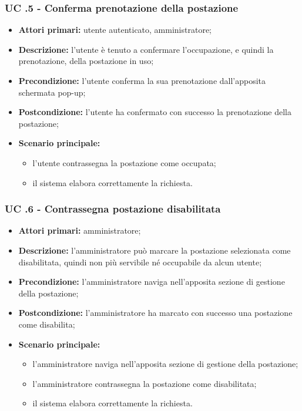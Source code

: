 \subsubsection{UC .5 - Conferma prenotazione della postazione}

\begin{itemize}
\item \textbf{Attori primari:} utente autenticato, amministratore;
\item \textbf{Descrizione:} l’utente è tenuto a confermare l’occupazione, e quindi la prenotazione, della postazione in uso;
\item \textbf{Precondizione:} l’utente conferma la sua prenotazione dall’apposita schermata pop-up; 
\item \textbf{Postcondizione:} l’utente ha confermato con successo la prenotazione della postazione;
\item \textbf{Scenario principale:} 
	\begin{itemize}
		\item l’utente contrassegna la postazione come occupata;
		\item il sistema elabora correttamente la richiesta.
	\end{itemize}
\end{itemize}

\subsubsection{UC .6 - Contrassegna postazione disabilitata}

\begin{itemize}
\item \textbf{Attori primari:} amministratore;
\item \textbf{Descrizione:} l’amministratore può marcare la postazione selezionata come disabilitata, quindi non più servibile né occupabile da alcun utente;
\item \textbf{Precondizione:} l’amministratore naviga nell’apposita sezione di gestione della postazione;
\item \textbf{Postcondizione:} l’amministratore ha marcato con successo una postazione come disabilita;
\item \textbf{Scenario principale:} 
	\begin{itemize}
		\item l’amministratore naviga nell’apposita sezione di gestione della postazione;
		\item l’amministratore contrassegna la postazione come disabilitata;
		\item il sistema elabora correttamente la richiesta.
	\end{itemize}
\end{itemize}

